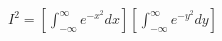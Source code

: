 \documentclass[preview]{standalone}
\begin{document}
\begin{align*}
I^2 =[ \int_{-\infty}^{\infty} e^{-x^2} dx ] [ \int_{-\infty}^{\infty} e^{-y^2} dy ]
\end{align*}
\end{document}
